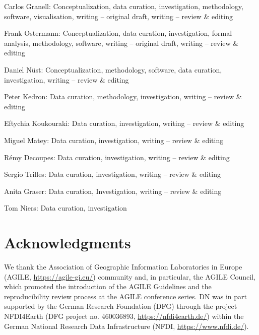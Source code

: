 \documentclass{josis}
\begin{document}
\noindent Carlos Granell: Conceptualization, data curation, investigation, methodology, software, visualisation, writing – original draft, writing – review \& editing

\noindent Frank Ostermann: Conceptualization, data curation, investigation, formal analysis, methodology, software, writing – original draft, writing – review \& editing

\noindent Daniel Nüst: Conceptualization, methodology, software, data curation, investigation, writing – review \& editing

\noindent Peter Kedron: Data curation, methodology, investigation, writing – review \& editing

\noindent Eftychia Koukouraki: Data curation, investigation, writing – review \& editing

\noindent Miguel Matey: Data curation, investigation, writing – review \& editing

\noindent Rémy Decoupes: Data curation, investigation, writing – review \& editing

\noindent Sergio Trilles: Data curation, investigation, writing – review \& editing

\noindent Anita Graser: Data curation, Investigation, writing – review \& editing

\noindent Tom Niers: Data curation, investigation

\section*{Acknowledgments}

We thank the Association of Geographic Information Laboratories in Europe (AGILE, \url{https://agile-gi.eu/}) community and, in particular, the AGILE Council, which promoted the introduction of the AGILE Guidelines and the reproducibility review process at the AGILE conference series. DN was in part supported by the German Research Foundation (DFG) through the project NFDI4Earth (DFG project no. 460036893, \url{https://nfdi4earth.de/}) within the German National Research Data Infrastructure (NFDI, \url{https://www.nfdi.de/}). 



\end{document}
